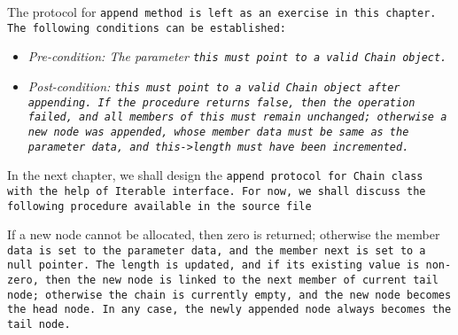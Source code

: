 The protocol for \tt{append} method is left as an exercise in this chapter.
The following conditions can be established:

\begin{itemize}

\item \it{Pre-condition}:
The parameter \tt{this} must point to a valid \tt{Chain} object.

\item \it{Post-condition}:
\tt{this} must point to a valid \tt{Chain} object after appending.
If the procedure returns \tt{false}, then the operation failed,
and all members of \tt{this} must remain unchanged; otherwise a
new node was appended, whose member \tt{data} must be same as the
parameter \tt{data}, and \tt{this->length} must have been incremented.

\end{itemize}

In the next chapter, we shall design the \tt{append} protocol
for \tt{Chain} class with the help of \tt{Iterable} interface.
For now, we shall discuss the following procedure available in the source file

If a new node cannot be allocated, then zero is returned;
otherwise the member \tt{data} is set to the parameter
\tt{data}, and the member \tt{next} is set to a null pointer.
The length is updated, and if its existing value is non-zero,
then the new node is linked to the \tt{next} member of current tail node;
otherwise the chain is currently empty, and the new node becomes the head node.
In any case, the newly appended node always becomes the tail node.
